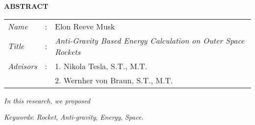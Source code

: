\begin{center}
  \large\textbf{ABSTRACT}
\end{center}


\vspace{2ex}

\begingroup
  \setlength{\tabcolsep}{0pt}

  \noindent
  \begin{tabularx}{\textwidth}{l >{\centering}m{3em} X}
    \emph{Name}     &:& Elon Reeve Musk \\

    \emph{Title}    &:& \emph{Anti-Gravity Based Energy Calculation on Outer Space Rockets} \\

    \emph{Advisors} &:& 1. Nikola Tesla, S.T., M.T. \\
                    & & 2. Wernher von Braun, S.T., M.T. \\
  \end{tabularx}
\endgroup

\emph{In this research, we proposed \lipsum[1]}

\emph{Keywords}: \emph{Rocket}, \emph{Anti-gravity}, \emph{Energy}, \emph{Space}.
